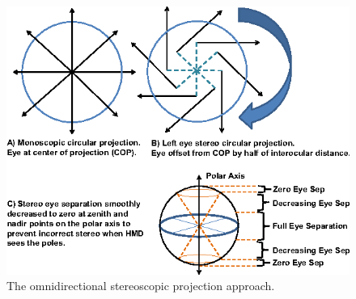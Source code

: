 \documentclass[10pt,twocolumn,letterpaper]{article}
\begin{document}
\begin{figure}[h]
\begin{center}
   \includegraphics[width=1.0\linewidth]{projection-approach.png}
\end{center}
   \caption{The omnidirectional stereoscopic projection approach.}
\label{fig:long}
\label{fig:onecol}
\end{figure}
\end{document}
